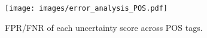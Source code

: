 \begin{figure}[t]
    \centering
    \texttt{[image: images/error\_analysis\_POS.pdf]}
    \caption{
    FPR/FNR of each uncertainty score across POS tags.
    }
    \label{fig:error_analysis_pos}
\end{figure}